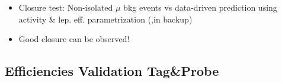 \documentclass{beamer}
\begin{document}
\begin{frame}
 \begin{itemize}
 \item Closure test: Non-isolated $\mu$ bkg events vs data-driven prediction using activity \& lep. \pt eff. parametrization (\HT,\NJets in backup)
 \item Good closure can be observed!
 \end{itemize}
\end{frame}
\subsection{Efficiencies Validation Tag\&Probe}
\end{document}
